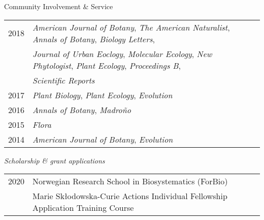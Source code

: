 \documentclass[11pt]{article}
\begin{document}
\begin{rSection}{Community Involvement \& Service}
\begin{tabular}{llr}
2018 & \textit{American Journal of Botany}, \textit{The American Naturalist}, \textit{Annals of Botany}, \textit{Biology Letters},\\
&  \textit{Journal of Urban Eoclogy}, \textit{Molecular Ecology}, \textit{New Phytologist}, \textit{Plant Ecology}, \textit{Proceedings B},\\ 
& \textit{Scientific Reports}\\

2017 & \textit{Plant Biology}, \textit{Plant Ecology}, \textit{Evolution}\\

2016 & \textit{Annals of Botany}, \textit{Madro{\~n}o} \\

2015 & \textit{Flora}\\
2014 & \textit{American Journal of Botany}, \textit{Evolution}
\end{tabular}

\par

\vspace{1em }

\noindent \textit{Scholarship \& grant applications}

\vspace{0.5em}

\begin{tabular}{llr}
2020 & Norwegian Research School in Biosystematics (ForBio) \\ 
& Marie Skłodowska-Curie Actions Individual Fellowship Application Training Course


\end{tabular}


\end{rSection}
\end{document}
